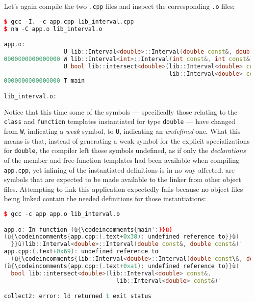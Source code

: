 \noindent Let's again compile the two \lstinline!.cpp! files and inspect the
corresponding \lstinline!.o! files:

\begin{lstlisting}[language=C++]
$ gcc -I. -c app.cpp lib_interval.cpp
$ nm -C app.o lib_interval.o

app.o:
                 U lib::Interval<double>::Interval(double const&, double const&)
0000000000000000 W lib::Interval<int>::Interval(int const&, int const&)
                 U bool lib::intersect<double>(lib::Interval<double> const&,
                                               lib::Interval<double> const&)
0000000000000000 T main

lib_interval.o:
\end{lstlisting}
    
\noindent Notice that this time some of the symbols --- specifically those
relating to the \lstinline!class! and \lstinline!function! templates
instantiated for type \lstinline!double! --- have changed from \lstinline!W!,
indicating a \emph{weak} symbol, to \lstinline!U!, indicating an
\emph{undefined} one. What this means is that, instead of generating a
weak symbol for the explicit specializations for \lstinline!double!, the
compiler left those symbols undefined, as if only the
\emph{declarations} of the member and free-function templates had been
available when compiling \lstinline!app.cpp!, yet inlining of the
instantiated definitions is in no way affected.  are symbols that are expected to be made available to the
linker from other object files. Attempting to link this application
expectedly fails because no object files being linked contain the needed
definitions for those instantiations:

\begin{lstlisting}[language=C++]
$ gcc -c app app.o lib_interval.o

app.o: In function (ù{\codeincomments{main':}}ù)
(ù{\codeincomments{app.cpp:(.text+0x38): undefined reference to}}ù)
  }}ù)lib::Interval<double>::Interval(double const&, double const&)'
app.cpp:(.text+0x69): undefined reference to
  (ù{\codeincomments{lib::Interval<double>::Interval(double const\&, double const\&)'}}ù)
(ù{\codeincomments{app.cpp:(.text+0xa1): undefined reference to}}ù)
  bool lib::intersect<double>(lib::Interval<double> const&,
                                lib::Interval<double> const&)'

collect2: error: ld returned 1 exit status
\end{lstlisting}
    
